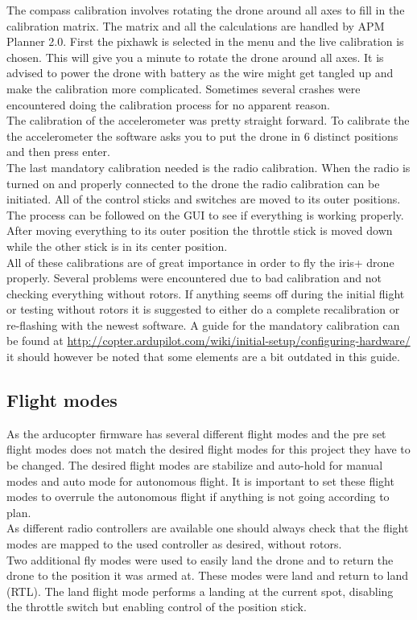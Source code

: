 The compass calibration involves rotating the drone around all axes to fill in the calibration matrix. The matrix and all the calculations are handled by APM Planner 2.0. First the pixhawk is selected in the menu and the live calibration is chosen. This will give you a minute to rotate the drone around all axes. It is advised to power the drone with battery as the wire might get tangled up and make the calibration more complicated. Sometimes several crashes were encountered doing the calibration process for no apparent reason.\\

The calibration of the accelerometer was pretty straight forward. To calibrate the the accelerometer the software asks you to put the drone in 6 distinct positions and then press enter.\\

The last mandatory calibration needed is the radio calibration. When the radio is turned on and properly connected to the drone the radio calibration can be initiated. All of the control sticks and switches are moved to its outer positions.  The process can be followed on the GUI to see if everything is working properly. After moving everything to its outer position the throttle stick is moved down while the other stick is in its center position.\\

All of these calibrations are of great importance in order to fly the iris+ drone properly. Several problems were encountered due to bad calibration and not checking everything without rotors. If anything seems off during the initial flight or testing without rotors it is suggested to either do a complete recalibration or re-flashing with the newest software. A guide for the mandatory calibration can be found at \url{http://copter.ardupilot.com/wiki/initial-setup/configuring-hardware/} it should however be noted that some elements are a bit outdated in this guide.

\subsection*{Flight modes}
As the arducopter firmware has several different flight modes and the pre set flight modes does not match the desired flight modes for this project they have to be changed. The desired flight modes are stabilize and auto-hold for manual modes and auto mode for autonomous flight. It is important to set these flight modes to overrule the autonomous flight if anything is not going according to plan.\\
As different radio controllers are available one should always check that the flight modes are mapped to the used controller as desired, without rotors.\\
Two additional fly modes were used to easily land the drone and to return the drone to the position it was armed at. These modes were land and return to land (RTL). The land flight mode performs a landing at the current spot, disabling the throttle switch but enabling control of the position stick.\\

